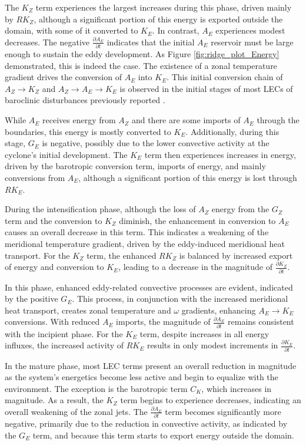 The $K_Z$ term experiences the largest increases during this phase, driven mainly by $RK_Z$, although a significant portion of this energy is exported outside the domain, with some of it converted to $K_E$. In contrast, $A_E$ experiences modest decreases. The negative $\frac{\partial A_E}{\partial t}$ indicates that the initial $A_E$ reservoir must be large enough to sustain the eddy development. As Figure \ref{fig:ridge_plot_Energy} demonstrated, this is indeed the case. The existence of a zonal temperature gradient drives the conversion of $A_E$ into $K_E$. This initial conversion chain of $A_Z \rightarrow K_Z$ and $A_Z \rightarrow A_E \rightarrow K_E$ is observed in the initial stages of most LECs of baroclinic disturbances previously reported \citep[e.g.,]{michaelides1992spatial,pezza2010environmental,dias2011energy,black2013universal}.

While $A_E$ receives energy from $A_Z$ and there are some imports of $A_E$ through the boundaries, this energy is mostly converted to $K_E$. Additionally, during this stage, $G_E$ is negative, possibly due to the lower convective activity at the cyclone's initial development. The $K_E$ term then experiences increases in energy, driven by the barotropic conversion term, imports of energy, and mainly conversions from $A_E$, although a significant portion of this energy is lost through $RK_E$.

During the intensification phase, although the loss of $A_Z$ energy from the $G_Z$ term and the conversion to $K_Z$ diminish, the enhancement in conversion to $A_E$ causes an overall decrease in this term. This indicates a weakening of the meridional temperature gradient, driven by the eddy-induced meridional heat transport. For the $K_Z$ term, the enhanced $RK_Z$ is balanced by increased export of energy and conversion to $K_E$, leading to a decrease in the magnitude of $\frac{\partial K_Z}{\partial t}$.

In this phase, enhanced eddy-related convective processes are evident, indicated by the positive $G_E$. This process, in conjunction with the increased meridional heat transport, creates zonal temperature and $\omega$ gradients, enhancing $A_E \rightarrow K_E$ conversions. With reduced $A_E$ imports, the magnitude of $\frac{\partial A_E}{\partial t}$ remains consistent with the incipient phase. For the $K_E$ term, despite increases in all energy influxes, the increased activity of $RK_E$ results in only modest increments in $\frac{\partial K_E}{\partial t}$.

In the mature phase, most LEC terms present an overall reduction in magnitude as the system's energetics become less active and begin to equalize with the environment. The exception is the barotropic term $C_K$, which increases in magnitude. As a result, the $K_Z$ term begins to experience decreases, indicating an overall weakening of the zonal jets. The $\frac{\partial A_E}{\partial t}$ term becomes significantly more negative, primarily due to the reduction in convective activity, as indicated by the $G_E$ term, and because this term starts to export energy outside the domain.

